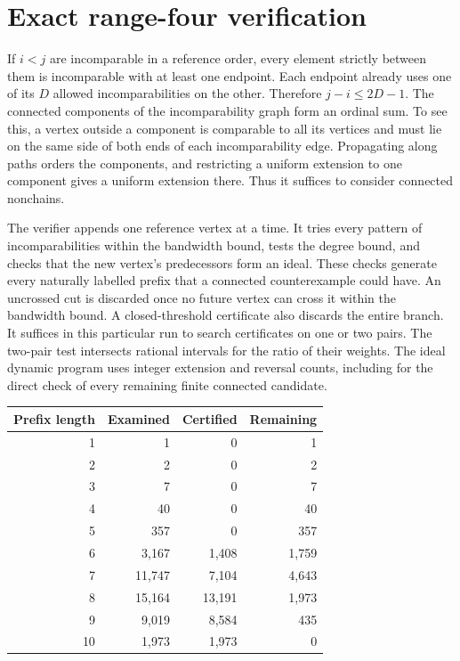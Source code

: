 \documentclass[11pt]{article}
\begin{document}
\section{Exact range-four verification}

If $i<j$ are incomparable in a reference order, every element strictly between them is incomparable with at least one endpoint. Each endpoint already uses one of its $D$ allowed incomparabilities on the other. Therefore $j-i\le 2D-1$. The connected components of the incomparability graph form an ordinal sum. To see this, a vertex outside a component is comparable to all its vertices and must lie on the same side of both ends of each incomparability edge. Propagating along paths orders the components, and restricting a uniform extension to one component gives a uniform extension there. Thus it suffices to consider connected nonchains.

The verifier appends one reference vertex at a time. It tries every pattern of incomparabilities within the bandwidth bound, tests the degree bound, and checks that the new vertex's predecessors form an ideal. These checks generate every naturally labelled prefix that a connected counterexample could have. An uncrossed cut is discarded once no future vertex can cross it within the bandwidth bound. A closed-threshold certificate also discards the entire branch. It suffices in this particular run to search certificates on one or two pairs. The two-pair test intersects rational intervals for the ratio of their weights. The ideal dynamic program uses integer extension and reversal counts, including for the direct check of every remaining finite connected candidate.

\begin{center}
\small
\begin{tabular}{rrrr}
\toprule
Prefix length & Examined & Certified & Remaining\\
\midrule
1 & 1 & 0 & 1\\
2 & 2 & 0 & 2\\
3 & 7 & 0 & 7\\
4 & 40 & 0 & 40\\
5 & 357 & 0 & 357\\
6 & 3,167 & 1,408 & 1,759\\
7 & 11,747 & 7,104 & 4,643\\
8 & 15,164 & 13,191 & 1,973\\
9 & 9,019 & 8,584 & 435\\
10 & 1,973 & 1,973 & 0\\
\bottomrule
\end{tabular}
\end{center}
\end{document}
